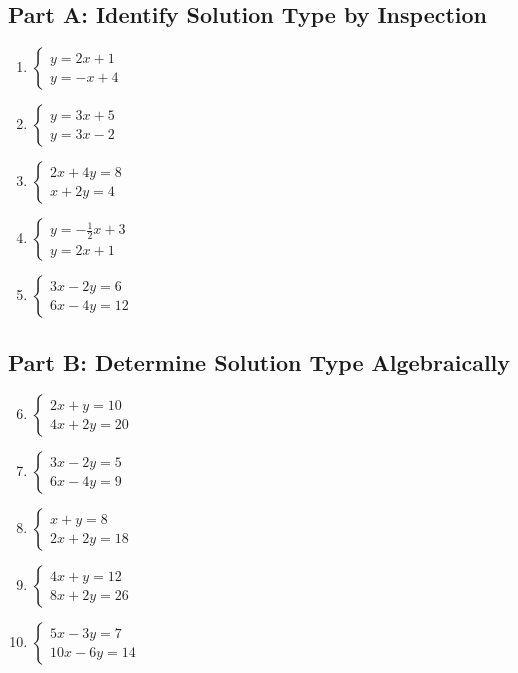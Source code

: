 \documentclass[14pt]{extarticle}
\begin{document}
\subsection*{Part A: Identify Solution Type by Inspection}
\begin{enumerate}
    \item \(\begin{cases} y = 2x + 1 \\ y = -x + 4 \end{cases}\)
    \item \(\begin{cases} y = 3x + 5 \\ y = 3x - 2 \end{cases}\)
    \item \(\begin{cases} 2x + 4y = 8 \\ x + 2y = 4 \end{cases}\)
    \item \(\begin{cases} y = -\tfrac{1}{2}x + 3 \\ y = 2x + 1 \end{cases}\)
    \item \(\begin{cases} 3x - 2y = 6 \\ 6x - 4y = 12 \end{cases}\)
\end{enumerate}

\subsection*{Part B: Determine Solution Type Algebraically}
\begin{enumerate}
    \setcounter{enumi}{5}
    \item \(\begin{cases} 2x + y = 10 \\ 4x + 2y = 20 \end{cases}\)
    \item \(\begin{cases} 3x - 2y = 5 \\ 6x - 4y = 9 \end{cases}\)
    \item \(\begin{cases} x + y = 8 \\ 2x + 2y = 18 \end{cases}\)
    \item \(\begin{cases} 4x + y = 12 \\ 8x + 2y = 26 \end{cases}\)
    \item \(\begin{cases} 5x - 3y = 7 \\ 10x - 6y = 14 \end{cases}\)
\end{enumerate}
\end{document}
